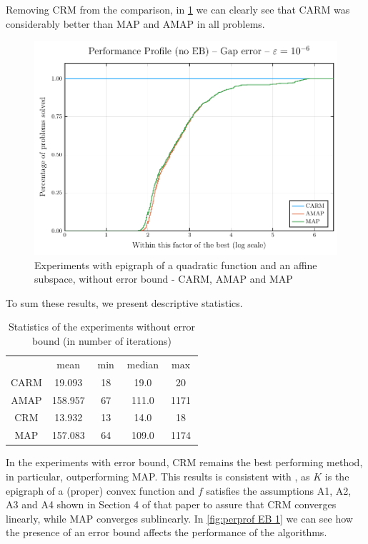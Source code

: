 \documentclass[smallextended,numbook,nospthms]{svjour3}
\theoremstyle{plain}
\theoremstyle{definition}
\begin{document}
Removing CRM from the comparison, in \cref{fig:perprof no EB 2} we can clearly see that CARM was considerably better than MAP and AMAP in all problems.
\begin{figure}[h!]
	\centering
	\includegraphics[scale=0.7]{fig2}
	\caption{Experiments with epigraph of a quadratic function and an affine subspace, without error bound - CARM, AMAP and MAP}
	\label{fig:perprof no EB 2}
\end{figure}
\newpage

To sum these results, we present descriptive statistics.
\begin{table}[h!]
\centering
\begin{tabular}{ccccc}
	\hline & mean & $\min$ & median & $\max$ \\
	\cline { 2 - 5 } CARM & 19.093 & 18 & 19.0 & 20 \\
	AMAP & 158.957 & 67 & 111.0 & 1171 \\
	CRM & 13.932 & 13 & 14.0 & 18 \\
	MAP & 157.083 & 64 & 109.0 & 1174 \\
	\hline
\end{tabular}
	\caption{Statistics of the experiments without error bound (in number of iterations)}
	\label{table:perprof no EB}
\end{table}

In the experiments with error bound, CRM remains the best performing method, in particular, outperforming MAP. This results is consistent with \cite{Behling:2020}, as $K$ is the epigraph of a (proper) convex function and $f$ satisfies the assumptions A1, A2, A3 and A4 shown in Section 4 of that paper to assure that CRM converges linearly, while MAP converges sublinearly. In \cref{fig:perprof EB 1} we can see how the presence of an error bound affects the performance of the algorithms.
\end{document}
